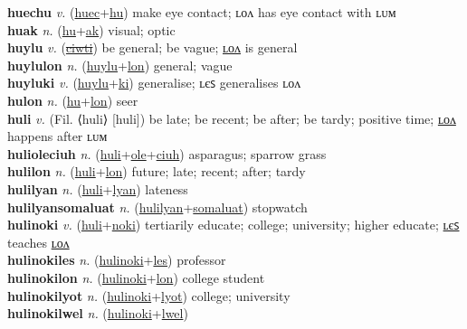 \textbf{huechu} \textit{v.} (\hyperref[huec]{huec}+\hyperref[hu]{hu})
make eye contact; ʟᴏᴧ has eye contact with ʟᴜᴍ \label{huechu} \\
\textbf{huak} \textit{n.} (\hyperref[hu]{hu}+\hyperref[ak]{ak})
visual; optic \label{huak} \\
\textbf{huylu} \textit{v.} (\hyperref[ciwti]{\sout{ciwti}})
be general; be vague; \hyperref[huylulon]{ʟᴏᴧ} is general \label{huylu} \\
\textbf{huylulon} \textit{n.} (\hyperref[huylu]{huylu}+\hyperref[lon]{lon})
general; vague \label{huylulon} \\
\textbf{huyluki} \textit{v.} (\hyperref[huylu]{huylu}+\hyperref[ki]{ki})
generalise; ʟєꜱ generalises ʟᴏᴧ \label{huyluki} \\
\textbf{hulon} \textit{n.} (\hyperref[hu]{hu}+\hyperref[lon]{lon})
seer \label{hulon} \\
\textbf{huli} \textit{v.} (Fil. ⟨huli⟩ [huli])
be late; be recent; be after; be tardy; positive time; \hyperref[hulilon]{ʟᴏᴧ} happens after ʟᴜᴍ \label{huli} \\
\textbf{hulioleciuh} \textit{n.} (\hyperref[huli]{huli}+\hyperref[ole]{ole}+\hyperref[ciuh]{ciuh})
asparagus; sparrow grass \label{hulioleciuh} \\
\textbf{hulilon} \textit{n.} (\hyperref[huli]{huli}+\hyperref[lon]{lon})
future; late; recent; after; tardy \label{hulilon} \\
\textbf{hulilyan} \textit{n.} (\hyperref[huli]{huli}+\hyperref[lyan]{lyan})
lateness \label{hulilyan} \\
\textbf{hulilyansomaluat} \textit{n.} (\hyperref[hulilyan]{hulilyan}+\hyperref[somaluat]{somaluat})
stopwatch \label{hulilyansomaluat} \\
\textbf{hulinoki} \textit{v.} (\hyperref[huli]{huli}+\hyperref[noki]{noki})
tertiarily educate; college; university; higher educate; \hyperref[hulinokiles]{ʟєꜱ} teaches \hyperref[hulinokilon]{ʟᴏᴧ} \label{hulinoki} \\
\textbf{hulinokiles} \textit{n.} (\hyperref[hulinoki]{hulinoki}+\hyperref[les]{les})
professor \label{hulinokiles} \\
\textbf{hulinokilon} \textit{n.} (\hyperref[hulinoki]{hulinoki}+\hyperref[lon]{lon})
college student \label{hulinokilon} \\
\textbf{hulinokilyot} \textit{n.} (\hyperref[hulinoki]{hulinoki}+\hyperref[lyot]{lyot})
college; university \label{hulinokilyot} \\
\textbf{hulinokilwel} \textit{n.} (\hyperref[hulinoki]{hulinoki}+\hyperref[lwel]{lwel})
